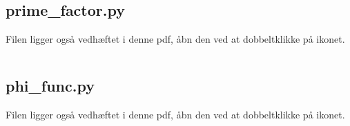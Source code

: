 \subsection{prime\_factor.py}
\label{file:prime_factor}
Filen ligger også vedhæftet i denne pdf, åbn den ved at dobbeltklikke på ikonet.
\inputminted[python3, linenos, breaklines, frame=lines, fontsize=\footnotesize]{python}{src/prime_factor.py}


\subsection{phi\_func.py}
\label{file:phi_func}
Filen ligger også vedhæftet i denne pdf, åbn den ved at dobbeltklikke på ikonet.
\inputminted[python3, linenos, breaklines, frame=lines, fontsize=\footnotesize]{python}{src/phi_func.py}
